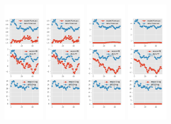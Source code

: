 \documentclass[]{article}
\begin{document}
\begin{figure}[ht]
\begin{subfigure}[b]{\textwidth}
		\includegraphics[width=0.19\textwidth]{figures/sce_se_est_joint_diag1.png}
		\includegraphics[width=0.19\textwidth]{figures/sce_se_est_joint_diag2.png}
		\includegraphics[width=0.19\textwidth]{figures/sce_se_est_joint_diag3.png}
		\includegraphics[width=0.19\textwidth]{figures/sce_se_est_joint_diag4.png}

\end{subfigure}
\end{figure}
\end{document}
